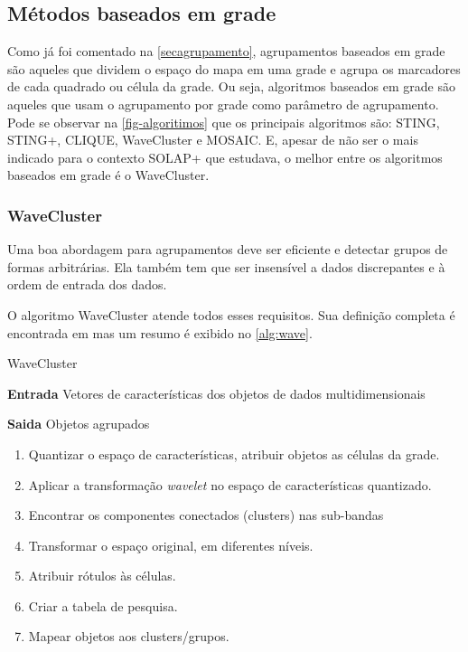 		\subsection{Métodos baseados em grade}
		Como já foi comentado na \autoref{secagrupamento}, agrupamentos baseados em grade são aqueles que dividem o espaço do mapa em uma grade e agrupa os marcadores de cada quadrado ou célula da grade.  Ou seja, algoritmos baseados em grade são aqueles que usam o agrupamento por grade como parâmetro de agrupamento. 
		Pode se observar na \autoref{fig-algoritimos} que os principais algoritmos são: STING, STING+, CLIQUE, WaveCluster e MOSAIC. E, apesar de não ser o mais indicado para o contexto SOLAP+ que \cite{silva2010solap+} estudava, o melhor entre os algoritmos baseados em grade é o WaveCluster.
		
		
		\subsubsection{WaveCluster}
			Uma boa abordagem para agrupamentos deve ser eficiente e detectar grupos de formas arbitrárias. Ela também tem que ser insensível a dados discrepantes e à ordem de entrada dos dados.
			
			O algoritmo WaveCluster atende todos esses requisitos. Sua definição completa é encontrada em \cite{wavecluster} mas um resumo é exibido no \autoref{alg:wave}.

\begin{algorithm}
\caption{WaveCluster}\label{alg:wave}

\textbf{Entrada} Vetores de características dos objetos de dados multidimensionais

\textbf{Saida} Objetos agrupados
\begin{enumerate}
\item Quantizar o espaço de características, atribuir objetos as células da grade.
\item Aplicar a transformação \textit{wavelet} no espaço de características quantizado.
\item Encontrar os componentes conectados (clusters) nas sub-bandas
\item Transformar o espaço original, em diferentes níveis.
\item Atribuir rótulos às células.
\item Criar a tabela de pesquisa.
\item Mapear objetos aos clusters/grupos.
\end{enumerate}
\end{algorithm}

